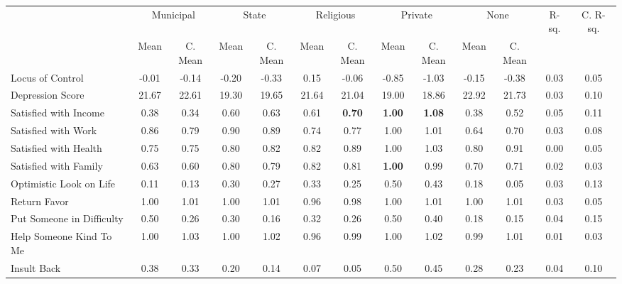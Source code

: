 \begin{tabular}{l c c c c c c c c c c c c}
\toprule
& \multicolumn{2}{c}{Municipal} & \multicolumn{2}{c}{State} & \multicolumn{2}{c}{Religious} & \multicolumn{2}{c}{Private} & \multicolumn{2}{c}{None} & R-sq. & C. R-sq. \\
& \scriptsize Mean & \scriptsize C. Mean & \scriptsize Mean & \scriptsize C. Mean & \scriptsize Mean & \scriptsize C. Mean & \scriptsize Mean & \scriptsize C. Mean & \scriptsize Mean & \scriptsize C. Mean & & \\
\midrule
Locus of Control &     -0.01 & -0.14 &     -0.20 & -0.33 &      0.15 & -0.06 &     -0.85 & -1.03 &     -0.15 & -0.38 &      0.03 &      0.05 \\
Depression Score &     21.67 & 22.61 &     19.30 & 19.65 &     21.64 & 21.04 &     19.00 & 18.86 &     22.92 & 21.73 &      0.03 &      0.10 \\
Satisfied with Income &      0.38 & 0.34 &      0.60 & 0.63 &      0.61 & \textbf{     0.70} & \textbf{     1.00} & \textbf{     1.08} &      0.38 & 0.52 &      0.05 &      0.11 \\
Satisfied with Work &      0.86 & 0.79 &      0.90 & 0.89 &      0.74 & 0.77 &      1.00 & 1.01 &      0.64 & 0.70 &      0.03 &      0.08 \\
Satisfied with Health &      0.75 & 0.75 &      0.80 & 0.82 &      0.82 & 0.89 &      1.00 & 1.03 &      0.80 & 0.91 &      0.00 &      0.05 \\
Satisfied with Family &      0.63 & 0.60 &      0.80 & 0.79 &      0.82 & 0.81 & \textbf{     1.00} & 0.99 &      0.70 & 0.71 &      0.02 &      0.03 \\
Optimistic Look on Life &      0.11 & 0.13 &      0.30 & 0.27 &      0.33 & 0.25 &      0.50 & 0.43 &      0.18 & 0.05 &      0.03 &      0.13 \\
Return Favor &      1.00 & 1.01 &      1.00 & 1.01 &      0.96 & 0.98 &      1.00 & 1.01 &      1.00 & 1.01 &      0.03 &      0.05 \\
Put Someone in Difficulty &      0.50 & 0.26 &      0.30 & 0.16 &      0.32 & 0.26 &      0.50 & 0.40 &      0.18 & 0.15 &      0.04 &      0.15 \\
Help Someone Kind To Me &      1.00 & 1.03 &      1.00 & 1.02 &      0.96 & 0.99 &      1.00 & 1.02 &      0.99 & 1.01 &      0.01 &      0.03 \\
Insult Back &      0.38 & 0.33 &      0.20 & 0.14 &      0.07 & 0.05 &      0.50 & 0.45 &      0.28 & 0.23 &      0.04 &      0.10 \\
\bottomrule
\end{tabular}
